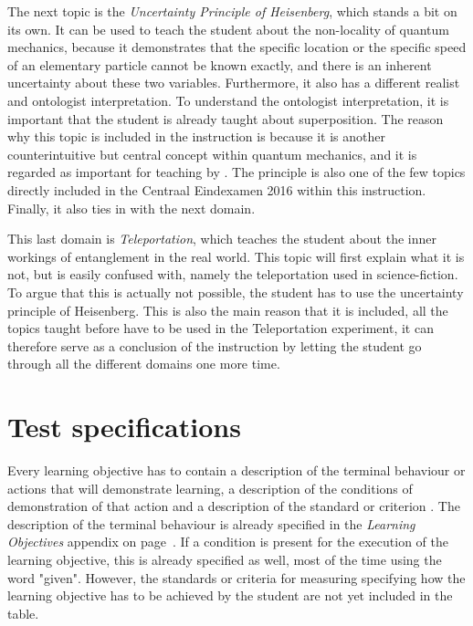 \documentclass[11pt,twoside]{report} %
\begin{document}
The next topic is the \emph{Uncertainty Principle of Heisenberg}, which stands a bit on its own. It can be used to teach the student about the non-locality of quantum mechanics, because it demonstrates that the specific location or the specific speed of an elementary particle cannot be known exactly, and there is an inherent uncertainty about these two variables. Furthermore, it also has a different realist and ontologist interpretation. To understand the ontologist interpretation, it is important that the student is already taught about superposition. The reason why this topic is included in the instruction is because it is another counterintuitive but central concept within quantum mechanics, and it is regarded as important for teaching by . The principle is also one of the few topics directly included in the Centraal Eindexamen 2016 \cite{eindexamen2016} within this instruction. Finally, it also ties in with the next domain.

This last domain is \emph{Teleportation}, which teaches the student about the inner workings of entanglement in the real world. This topic will first explain what it is not, but is easily confused with, namely the teleportation used in science-fiction. To argue that this is actually not possible, the student has to use the uncertainty principle of Heisenberg. This is also the main reason that it is included, all the topics taught before have to be used in the Teleportation experiment, it can therefore  serve as a conclusion of the instruction by letting the student go through all the different domains one more time.

\section{Test specifications}
\label{subch:testspecifications}

Every learning objective has to contain a description of the terminal behaviour or actions that will demonstrate learning, a description of the conditions of demonstration of that action and a description of the standard or criterion \cite{smithragan}. The description of the terminal behaviour is already specified in the \emph{Learning Objectives} appendix on page~\pageref{app:learningobjectives}. If a condition is present for the execution of the learning objective, this is already specified as well, most of the time using the word "given". However, the standards or criteria for measuring specifying how the learning objective has to be achieved by the student are not yet included in the table.
\end{document}
